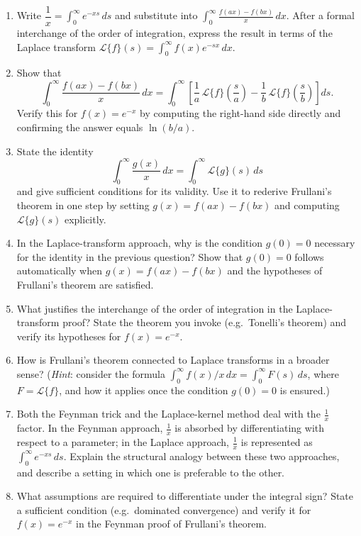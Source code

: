 \begin{enumerate}
  \item Write $\dfrac{1}{x} = \int_0^\infty e^{-xs}\,ds$ and substitute into $\displaystyle\int_0^\infty
    \frac{f(ax)-f(bx)}{x}\,dx$.
    After a formal interchange of the order of integration, express the result in terms of the Laplace
    transform $\mathcal{L}\{f\}(s) = \int_0^\infty f(x)e^{-sx}\,dx$.
  \item Show that
    \[
      \int_0^\infty \frac{f(ax)-f(bx)}{x}\,dx
      = \int_0^\infty \left[
        \frac{1}{a}\,\mathcal{L}\{f\}\!\left(\frac{s}{a}\right)
        - \frac{1}{b}\,\mathcal{L}\{f\}\!\left(\frac{s}{b}\right)
      \right]ds.
    \]
    Verify this for $f(x) = e^{-x}$ by computing the right-hand side directly and confirming the answer
    equals $\ln(b/a)$.
  \item State the identity
    \[
      \int_0^\infty \frac{g(x)}{x}\,dx = \int_0^\infty \mathcal{L}\{g\}(s)\,ds
    \]
    and give sufficient conditions for its validity. Use it to rederive Frullani's theorem in one step
    by setting $g(x) = f(ax) - f(bx)$ and computing $\mathcal{L}\{g\}(s)$ explicitly.
  \item In the Laplace-transform approach, why is the condition $g(0) = 0$ necessary for the identity
    in the previous question? Show that $g(0) = 0$ follows automatically when $g(x) = f(ax) - f(bx)$ and
    the hypotheses of Frullani's theorem are satisfied.
  \item What justifies the interchange of the order of integration in the Laplace-transform proof? State
    the theorem you invoke (e.g.\ Tonelli's theorem) and verify its hypotheses for $f(x) = e^{-x}$.
  \item How is Frullani's theorem connected to Laplace transforms in a broader sense? (\textit{Hint}:
      consider the formula $\int_0^\infty f(x)/x\,dx = \int_0^\infty F(s)\,ds$, where $F = \mathcal{L}\{f\}$,
    and how it applies once the condition $g(0) = 0$ is ensured.)


  \item Both the Feynman trick and the Laplace-kernel method deal with the $\tfrac{1}{x}$ factor. In the
    Feynman approach, $\tfrac{1}{x}$ is absorbed by differentiating with respect to a parameter; in the
    Laplace approach, $\tfrac{1}{x}$ is represented as $\int_0^\infty e^{-xs}\,ds$. Explain the structural
    analogy between these two approaches, and describe a setting in which one is preferable to the other.


  \item What assumptions are required to differentiate under the integral sign? State a sufficient condition
    (e.g.\ dominated convergence) and verify it for $f(x) = e^{-x}$ in the Feynman proof of Frullani's theorem.

\end{enumerate}
